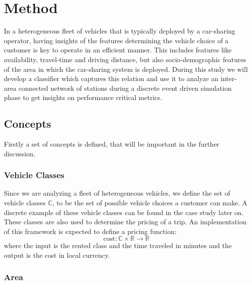 \clearpage
\section{Method}
\label{sec:Method}

In a heterogeneous fleet of vehicles that is typically deployed by a car-sharing operator,
having insights of the features determining the vehicle choice of a customer is key
to operate in an efficient manner. This includes features like availability, travel-time
and driving distance, but also socio-demographic features of the area in which the
car-sharing system is deployed. During this study we will develop a classifier which 
captures this relation and use it to analyze an inter-area connected network of stations
during a discrete event driven simulation phase to get insights on performance critical
metrics.

\subsection{Concepts}
\label{sub_sec:Method/Concepts}

Firstly a set of concepts is defined, that will be important in the further discussion.

\subsubsection{Vehicle Classes}
\label{sub_sec:Method/Concepts/Classes}

Since we are analyzing a fleet of heterogeneous vehicles, we define the set of vehicle
classes $\mathbb{C}$, to be the set of possible vehicle choices a customer can make. A
discrete example of these vehicle classes can be found in the case study later on. These
classes are also used to determine the pricing of a trip. An implementation of this
framework is expected to define a pricing function:
$$
\text{cost}: \mathbb{C} \times  \mathbb{R} \to \mathbb{R}
$$
where the input is the rented class and the time traveled in minutes and the output is the
cost in local currency.

\subsubsection{Area}
\label{sub_sec:Method/Concepts/Area}

